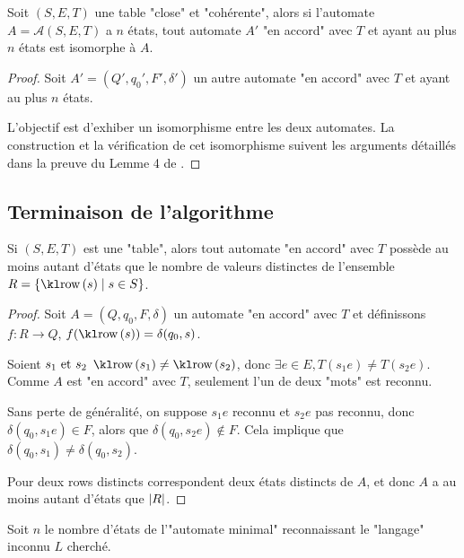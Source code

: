 \begin{lemma}
	Soit $(S,E,T)$ une table "close" et "cohérente", alors si l'automate $A = \mathcal A (S,E,T)$
	a $n$ états, tout automate $A'$ "en accord" avec $T$ et ayant au plus $n$ états est isomorphe à $A$.
\end{lemma}

\begin{proof}
	Soit $A' = (Q', q_0', F', \delta')$ un autre automate "en accord" avec $T$ et ayant au plus $n$ états.

	L'objectif est d'exhiber un isomorphisme entre les deux automates. La construction et la vérification
	de cet isomorphisme suivent les arguments détaillés dans la preuve du Lemme 4 de \cite{angluinLearning}.
\end{proof}

\subsection{Terminaison de l'algorithme}

\begin{lemma}
	Si $(S,E,T)$ est une "table", alors tout automate "en accord" avec $T$ possède au
	moins autant d'états que le nombre de valeurs distinctes de l'ensemble $R = \setdef {\row s} {s \in S}$.
\end{lemma}

\begin{proof}
	Soit $A = (Q,q_0,F,\delta)$ un automate "en accord" avec $T$ et définissons
	$f: R \to Q$, $f(\row s) = \delta(q_0, s)$.

	Soient $s_1 \text{ et } s_2$ \tq $\row {s_1} \neq \row{s_2}$, donc $\exists e \in E, T(s_1e) \neq T(s_2e)$.
	Comme $A$ est "en accord" avec $T$, seulement l'un de deux "mots" est reconnu.

	Sans perte de généralité, on suppose $s_1e$ reconnu et $s_2e$ pas reconnu, donc
	$\delta (q_0, s_1e) \in F$, alors que $\delta (q_0,s_2e) \notin F$. Cela implique que
	$\delta (q_0,s_1) \neq \delta (q_0,s_2)$.


	Pour deux rows distincts correspondent deux états distincts de $A$, et donc $A$ a au moins autant d'états que $\left|R\right|$.
\end{proof}

Soit $n$ le nombre d'états de l'"automate minimal" reconnaissant le "langage" inconnu $L$ cherché.

